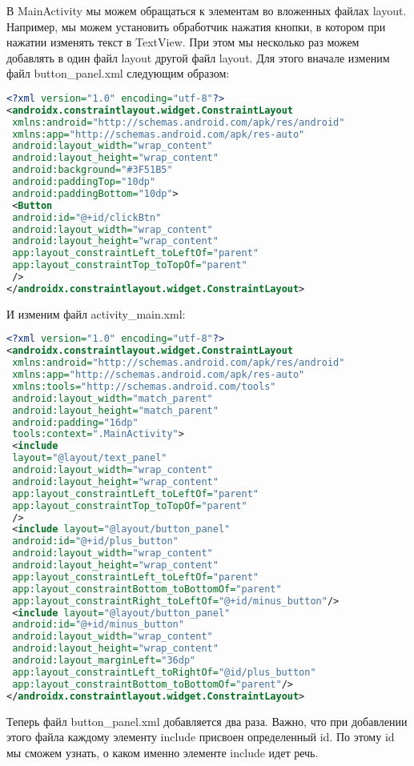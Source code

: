В MainActivity мы можем обращаться к элементам во вложенных файлах
layout. Например, мы можем установить обработчик нажатия кнопки, в
котором при нажатии изменять текст в TextView.
При этом мы несколько раз можем добавлять в один файл layout другой файл
layout. Для этого вначале изменим файл button\_panel.xml следующим
образом:
\begin{lstlisting}[language=xml, caption=\leftline{xml}, label=lst:button_panel2.xml]
<?xml version="1.0" encoding="utf-8"?>
<androidx.constraintlayout.widget.ConstraintLayout
 xmlns:android="http://schemas.android.com/apk/res/android"
 xmlns:app="http://schemas.android.com/apk/res-auto"
 android:layout_width="wrap_content"
 android:layout_height="wrap_content"
 android:background="#3F51B5"
 android:paddingTop="10dp"
 android:paddingBottom="10dp">
 <Button
 android:id="@+id/clickBtn"
 android:layout_width="wrap_content"
 android:layout_height="wrap_content"
 app:layout_constraintLeft_toLeftOf="parent"
 app:layout_constraintTop_toTopOf="parent"
 />
</androidx.constraintlayout.widget.ConstraintLayout>
\end{lstlisting}
И изменим файл activity\_main.xml:
\begin{lstlisting}[language=xml, caption=\leftline{xml}, label=lst:activity\_main.xml]
<?xml version="1.0" encoding="utf-8"?>
<androidx.constraintlayout.widget.ConstraintLayout
 xmlns:android="http://schemas.android.com/apk/res/android"
 xmlns:app="http://schemas.android.com/apk/res-auto"
 xmlns:tools="http://schemas.android.com/tools"
 android:layout_width="match_parent"
 android:layout_height="match_parent"
 android:padding="16dp"
 tools:context=".MainActivity">
 <include
 layout="@layout/text_panel"
 android:layout_width="wrap_content"
 android:layout_height="wrap_content"
 app:layout_constraintLeft_toLeftOf="parent"
 app:layout_constraintTop_toTopOf="parent"
 />
 <include layout="@layout/button_panel"
 android:id="@+id/plus_button"
 android:layout_width="wrap_content"
 android:layout_height="wrap_content"
 app:layout_constraintLeft_toLeftOf="parent"
 app:layout_constraintBottom_toBottomOf="parent"
 app:layout_constraintRight_toLeftOf="@+id/minus_button"/>
 <include layout="@layout/button_panel"
 android:id="@+id/minus_button"
 android:layout_width="wrap_content"
 android:layout_height="wrap_content"
 android:layout_marginLeft="36dp"
 app:layout_constraintLeft_toRightOf="@id/plus_button"
 app:layout_constraintBottom_toBottomOf="parent"/>
</androidx.constraintlayout.widget.ConstraintLayout>
\end{lstlisting}
Теперь файл button_panel.xml добавляется два раза. Важно, что при
добавлении этого файла каждому элементу include присвоен определенный
id. По этому id мы сможем узнать, о каком именно элементе include идет
речь.

